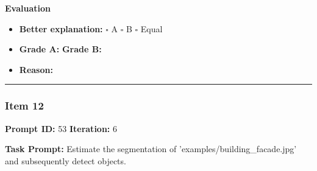 \documentclass[11pt]{article}
\begin{document}
\vspace{1em}

\textbf{Evaluation}
\begin{itemize}
    \item \textbf{Better explanation:} \hspace{1em} $\square$ A \hspace{1em} $\square$ B \hspace{1em} $\square$ Equal
    \item \textbf{Grade A:} \underline{\hspace{2cm}} \hspace{1em} \textbf{Grade B:} \underline{\hspace{2cm}}
    \item \textbf{Reason:} \\[4.5em]
\end{itemize}

\vspace{1em}
\hrule
\vspace{1em}


\subsubsection*{Item 12}
\textbf{Prompt ID:} 53 \hfill \textbf{Iteration:} 6

\textbf{Task Prompt:} Estimate the segmentation of 'examples/building\_facade.jpg' and subsequently detect objects.
\end{document}
